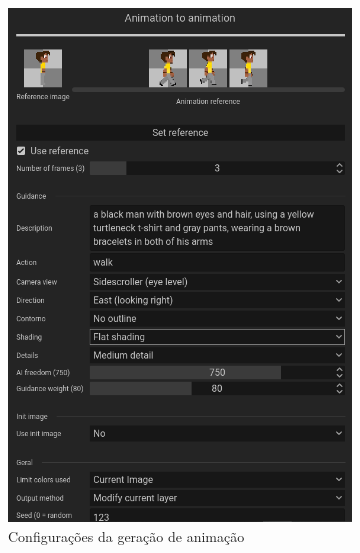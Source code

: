 \begin{figure}[htbp]
    \centering
    \caption{\small Processo da utilização 8 da ferramenta de animação do PixelLab em julho/2025}
    \label{fig:pixelLabAnimacao8}

    \begin{subfigure}{0.6\linewidth}
        \includegraphics[width=1\linewidth]{figs/pixelLab/dia4/tela2.PNG}
        \caption{\small Configurações da geração de animação}
        \label{fig:pixelLabAnimacao8a}
    \end{subfigure}
    \begin{subfigure}{0.35\linewidth}

\end{subfigure}
\end{figure}
